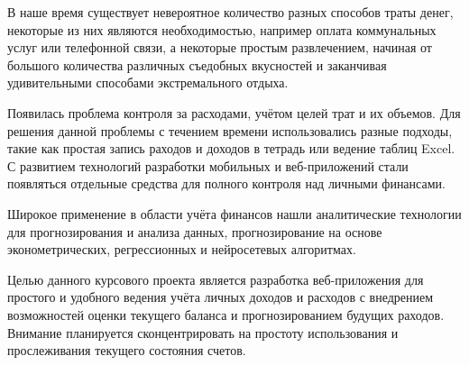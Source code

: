 
В наше время существует невероятное количество разных способов траты денег, некоторые 
из них являются необходимостью, например оплата коммунальных услуг или телефонной 
связи, а некоторые простым развлечением, начиная от большого количества различных 
съедобных вкусностей и заканчивая удивительными способами экстремального отдыха.

Появилась проблема контроля за расходами, учётом целей трат и их объемов. Для 
решения данной проблемы с течением времени использовались разные подходы, 
такие как простая запись раходов и доходов в тетрадь или ведение таблиц Excel.
С развитием технологий разработки мобильных и веб-приложений стали появляться отдельные 
средства для полного контроля над личными финансами.

Широкое применение в области учёта финансов нашли аналитические технологии для прогнозирования
и анализа данных, прогнозирование на основе эконометрических, регрессионных и нейросетевых
алгоритмах.

Целью данного курсового проекта является разработка веб-приложения для простого и удобного 
ведения учёта личных доходов и расходов с внедрением возможностей оценки текущего баланса
и прогнозированием будущих раходов. Внимание планируется сконцентрировать на простоту 
использования и прослеживания текущего состояния счетов.